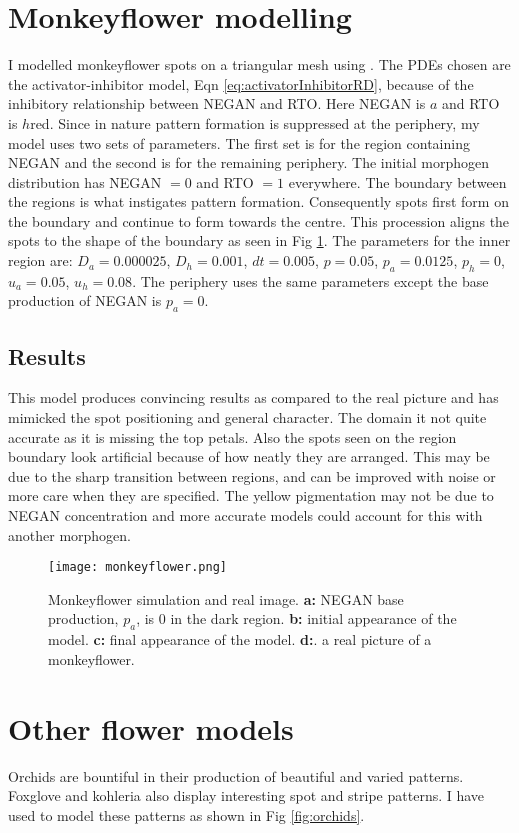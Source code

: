 \section{Monkeyflower modelling}
I modelled monkeyflower spots on a triangular mesh using \ProgramName{}. The PDEs chosen are the activator-inhibitor model, Eqn \eqref{eq:activatorInhibitorRD}, because of the inhibitory relationship between NEGAN and RTO. Here NEGAN is $a$ and RTO is $h$red. Since in nature pattern formation is suppressed at the periphery, my model uses two sets of parameters. The first set is for the region containing NEGAN and the second is for the remaining periphery. The initial morphogen distribution has NEGAN $= 0$ and RTO $= 1$ everywhere. The boundary between the regions is what instigates pattern formation. Consequently spots first form on the boundary and continue to form towards the centre. This procession aligns the spots to the shape of the boundary as seen in Fig \ref{fig:monkeyflower}. The parameters for the inner region are: $D_a=0.000025$, $D_h=0.001$, $dt=0.005$, $p=0.05$, $p_a=0.0125$, $p_h=0$, $u_a=0.05$, $u_h=0.08$. The periphery uses the same parameters except the base production of NEGAN is $p_a=0$.

\subsection*{Results}
This model produces convincing results as compared to the real picture and has mimicked the spot positioning and general character. The domain it not quite accurate as it is missing the top petals. Also the spots seen on the region boundary look artificial because of how neatly they are arranged. This may be due to the sharp transition between regions, and can be improved with noise or more care when they are specified. The yellow pigmentation may not be due to NEGAN concentration and more accurate models could account for this with another morphogen.

\begin{figure}[ht]
	\centering
	\texttt{[image: monkeyflower.png]}
	\caption{Monkeyflower simulation and real image. \textbf{a:} NEGAN base production, $p_a$, is 0 in the dark region. \textbf{b:} initial appearance of the model. \textbf{c:} final appearance of the model. \textbf{d:}. a real picture of a monkeyflower.}
	\label{fig:monkeyflower}
\end{figure}

\section{Other flower models}
Orchids are bountiful in their production of beautiful and varied patterns. Foxglove and kohleria also display interesting spot and stripe patterns. I have used \ProgramName{} to model these patterns as shown in Fig \ref{fig:orchids}. 

